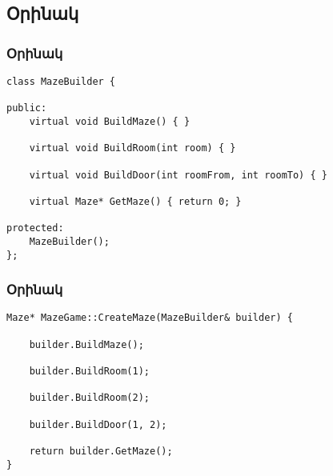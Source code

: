 \documentclass{beamer}
\begin{document}
\subsection{Օրինակ}
\begin{frame}[fragile]\frametitle{Օրինակ}
\begin{english}
\begin{verbatim}
class MazeBuilder {

public:
    virtual void BuildMaze() { }

    virtual void BuildRoom(int room) { }

    virtual void BuildDoor(int roomFrom, int roomTo) { }

    virtual Maze* GetMaze() { return 0; }

protected:
    MazeBuilder();
};
\end{verbatim}
\end{english}
\end{frame}

\begin{frame}[fragile]\frametitle{Օրինակ}
\begin{english}
\begin{verbatim}
Maze* MazeGame::CreateMaze(MazeBuilder& builder) {

    builder.BuildMaze();

    builder.BuildRoom(1);

    builder.BuildRoom(2);

    builder.BuildDoor(1, 2);

    return builder.GetMaze();
}
\end{verbatim}
\end{english}
\end{frame}
\end{document}

